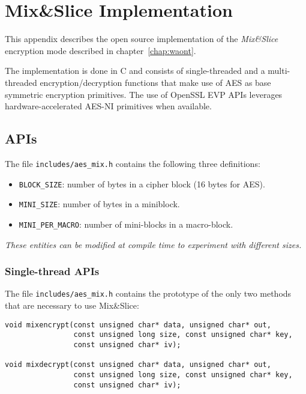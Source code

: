 \chapter[Mix\&Slice Implementation]{Mix\&Slice Implementation}

This appendix describes the open source implementation of the \emph{Mix\&Slice} encryption mode described in chapter~\ref{chap:waont}.

The implementation is done in C and consists of single-threaded and a
multi-threaded encryption/decryption functions that make use of AES as
base symmetric encryption primitives. The use of OpenSSL EVP APIs
leverages hardware-accelerated AES-NI primitives when available.

\section{APIs}\label{usage}

The file \texttt{includes/aes\_mix.h} contains the following three
definitions:

\begin{itemize}
\tightlist
\item
  \texttt{BLOCK\_SIZE}: number of bytes in a cipher block (16 bytes for
  AES).
\item
  \texttt{MINI\_SIZE}: number of bytes in a miniblock.
\item
  \texttt{MINI\_PER\_MACRO}: number of mini-blocks in a macro-block.
\end{itemize}

\emph{These entities can be modified at compile time to experiment with
different sizes.}

\subsection{Single-thread APIs}\label{single-thread-apis}

The file \texttt{includes/aes\_mix.h} contains the prototype of the only
two methods that are necessary to use Mix\&Slice:

\begin{verbatim}
void mixencrypt(const unsigned char* data, unsigned char* out,
                const unsigned long size, const unsigned char* key,
                const unsigned char* iv);

void mixdecrypt(const unsigned char* data, unsigned char* out,
                const unsigned long size, const unsigned char* key,
                const unsigned char* iv);
\end{verbatim}

